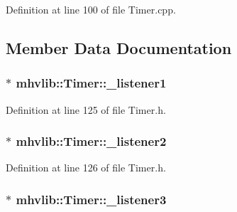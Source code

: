 Definition at line 100 of file Timer.\-cpp.



\subsection{Member Data Documentation}
\hypertarget{classmhvlib_1_1_timer_a4101a5f1852ba1706390fc8c621106e3}{
\subsubsection[{\-\_\-listener1}]{$\ast$ mhvlib\-::\-Timer\-::\-\_\-listener1\hspace{0.3cm}{\ttfamily [protected]}}}\label{classmhvlib_1_1_timer_a4101a5f1852ba1706390fc8c621106e3}


Definition at line 125 of file Timer.\-h.

\hypertarget{classmhvlib_1_1_timer_a6fa6caed544d2afd4cd2be8a41ff7b60}{
\subsubsection[{\-\_\-listener2}]{$\ast$ mhvlib\-::\-Timer\-::\-\_\-listener2\hspace{0.3cm}{\ttfamily [protected]}}}\label{classmhvlib_1_1_timer_a6fa6caed544d2afd4cd2be8a41ff7b60}


Definition at line 126 of file Timer.\-h.

\hypertarget{classmhvlib_1_1_timer_a364df7367363b6e87e383e72c3660b6b}{
\subsubsection[{\-\_\-listener3}]{$\ast$ mhvlib\-::\-Timer\-::\-\_\-listener3\hspace{0.3cm}{\ttfamily [protected]}}}\label{classmhvlib_1_1_timer_a364df7367363b6e87e383e72c3660b6b}


